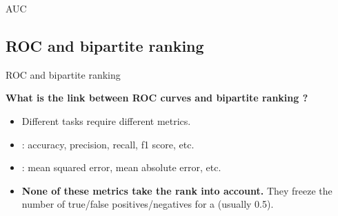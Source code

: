 \begin{frame}{AUC}


\end{frame}

\subsection{ROC and bipartite ranking}
\begin{frame}{ROC and bipartite ranking}

{\large\textbf{What is the link between ROC curves and bipartite ranking ?}}

\begin{itemize}
    \item Different tasks require different metrics.
    \item {} : accuracy, precision, recall, f1 score, etc.
    \item {} : mean squared error, mean absolute error, etc.
    \item \textbf{None of these metrics take the rank into account.} They freeze the number of true/false positives/negatives for a  (usually 0.5).
    
    \end{itemize} 


\end{frame}


